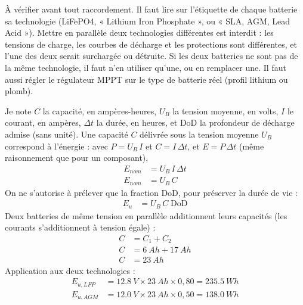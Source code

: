 \begin{attention}
À vérifier avant tout raccordement. Il faut lire sur l'étiquette de chaque batterie sa technologie (LiFePO4, « Lithium Iron Phosphate », ou « SLA, AGM, Lead Acid »). Mettre en parallèle deux technologies différentes est interdit : les tensions de charge, les courbes de décharge et les protections sont différentes, et l'une des deux serait surchargée ou détruite. Si les deux batteries ne sont pas de la même technologie, il faut n'en utiliser qu'une, ou en remplacer une. Il faut aussi régler le régulateur MPPT sur le type de batterie réel (profil lithium ou plomb).
\end{attention}

\begin{demonstration}
Je note $C$ la capacité, en ampères-heures, $U_B$ la tension moyenne, en volts, $I$ le courant, en ampères, $\Delta t$ la durée, en heures, et DoD la profondeur de décharge admise (sans unité). Une capacité $C$ délivrée sous la tension moyenne $U_B$ correspond à l'énergie : avec $P = U_B\, I$ et $C = I\,\Delta t$, et $E = P\,\Delta t$ (même raisonnement que pour un composant),
\begin{align*}
E_{nom} &= U_B\, I\,\Delta t\\
E_{nom} &= U_B\, C
\end{align*}
On ne s'autorise à prélever que la fraction DoD, pour préserver la durée de vie :
\begin{align*}
E_u &= U_B\, C\; \mathrm{DoD}
\end{align*}
Deux batteries de même tension en parallèle additionnent leurs capacités (les courants s'additionnent à tension égale) :
\begin{align*}
C &= C_1 + C_2\\
C &= \qty{6}{Ah} + \qty{17}{Ah}\\
C &= \qty{23}{Ah}
\end{align*}
Application aux deux technologies :
\begin{align*}
E_{u,LFP} &= \qty{12,8}{V} \times \qty{23}{Ah} \times 0{,}80 = \qty{235,5}{Wh}\\
E_{u,AGM} &= \qty{12,0}{V} \times \qty{23}{Ah} \times 0{,}50 = \qty{138,0}{Wh}
\end{align*}
\end{demonstration}

